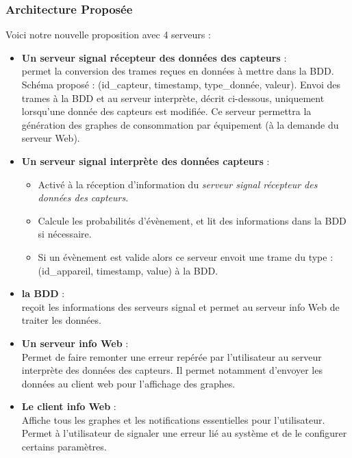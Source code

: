 \documentclass[10pt,a4paper]{article}
\begin{document}
\subsubsection{Architecture Proposée}
Voici notre nouvelle proposition avec 4 serveurs :
\begin{itemize}
  \item \textbf{Un serveur signal récepteur des données des capteurs} :\\
  permet la conversion des trames reçues en données à mettre dans la BDD. Schéma proposé : (id\_capteur, timestamp, type\_donnée, valeur). Envoi des trames à la BDD et au serveur interprète, décrit ci-dessous, uniquement lorsqu'une donnée des capteurs est modifiée. Ce serveur permettra la génération des graphes de consommation par équipement (à la demande du serveur Web).
  \item \textbf{Un serveur signal interprète des données capteurs} :
  \begin{itemize}
    \item Activé à la réception d'information du \textit{serveur signal récepteur des données des capteurs}.
    \item Calcule les probabilités d'évènement, et lit des informations dans la BDD si nécessaire.
    \item Si un évènement est valide alors ce serveur envoit une trame du type : (id\_appareil, timestamp, value) à la BDD.
  \end{itemize}
  \item \textbf{la BDD} : \\
  reçoit les informations des serveurs signal et permet au serveur info Web de traiter les données.
  \item \textbf{Un serveur info Web} :\\
  Permet de faire remonter une erreur repérée par l'utilisateur au serveur interprète des données des capteurs. Il permet notamment d'envoyer les données au client web pour l'affichage des graphes.
  \item \textbf{Le client info Web} :\\
  Affiche tous les graphes et les notifications essentielles pour l'utilisateur. Permet à l'utilisateur de signaler une erreur lié au système et de le configurer certains paramètres.
\end{itemize}
\end{document}

